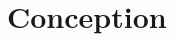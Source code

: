 \documentclass[12pt]{report}
\begin{document}
\renewcommand{\contentsname}{Sommaire}

\tableofcontents
\clearpage

\listoffigures
\clearpage

\listoftables
\clearpage




% 

% 

\chapter{Conception}


 

\end{document}
